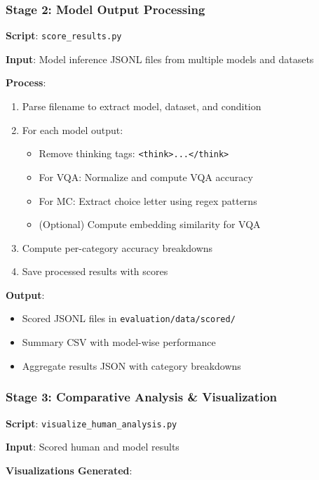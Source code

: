 \documentclass{article}
\begin{document}
\subsubsection{Stage 2: Model Output Processing}

\textbf{Script}: \texttt{score\_results.py}

\textbf{Input}: Model inference JSONL files from multiple models and datasets

\textbf{Process}:
\begin{enumerate}
    \item Parse filename to extract model, dataset, and condition
    \item For each model output:
    \begin{itemize}
        \item Remove thinking tags: \texttt{<think>...</think>}
        \item For VQA: Normalize and compute VQA accuracy
        \item For MC: Extract choice letter using regex patterns
        \item (Optional) Compute embedding similarity for VQA
    \end{itemize}
    \item Compute per-category accuracy breakdowns
    \item Save processed results with scores
\end{enumerate}

\textbf{Output}:
\begin{itemize}
    \item Scored JSONL files in \texttt{evaluation/data/scored/}
    \item Summary CSV with model-wise performance
    \item Aggregate results JSON with category breakdowns
\end{itemize}

\subsubsection{Stage 3: Comparative Analysis \& Visualization}

\textbf{Script}: \texttt{visualize\_human\_analysis.py}

\textbf{Input}: Scored human and model results

\textbf{Visualizations Generated}:
\end{document}
